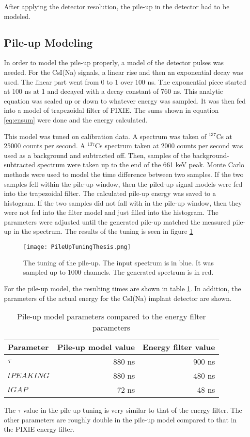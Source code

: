 \documentclass[../MaxHughesThesis.tex]{subfiles}
\begin{document}
After applying the detector resolution, the pile-up in the detector had to be modeled.

\subsection{Pile-up Modeling}
In order to model the pile-up properly, a model of the detector pulses was needed. 
For the CsI(Na) signals, a linear rise and then an exponential decay was used.
The linear part went from 0 to 1 over 100 ns. 
The exponential piece started at 100 ns at 1 and decayed with a decay constant of 760 ns.
This analytic equation was scaled up or down to whatever energy was sampled.
It was then fed into a model of trapezoidal filter of PIXIE. 
The sums shown in equation \ref{eq:ensum} were done and the energy calculated.

This model was tuned on calibration data. 
A spectrum was taken of $^{137}$Cs at 25000 counts per second.
A  $^{137}$Cs spectrum taken at 2000 counts per second was used as a background and subtracted off.
Then, samples of the background-subtracted spectrum were taken up to the end of the 661 keV peak.
Monte Carlo methods were used to model the time difference between two samples.
If the two samples fell within the pile-up window, then the piled-up signal models were fed into the trapezoidal filter.
The calculated pile-up energy was saved to a histogram.
If the two samples did not fall with in the pile-up window, then they were not fed into the filter model and just filled into the histogram.
The parameters were adjusted until the generated pile-up matched the measured pile-up in the spectrum.
The results of the tuning is seen in figure \ref{fig:pileuptune}

\begin{figure}[!htb]
	\centerline{\texttt{[image: PileUpTuningThesis.png]}}
	\caption{The tuning of the pile-up.
		 The input spectrum is in blue.
		 It was sampled up to 1000 channels.
		 The generated spectrum is in red.}
	\label{fig:pileuptune}
\end{figure}
For the pile-up model, the resulting times are shown in table \ref{tab:tunepileupmodel}.
In addition, the parameters of the actual energy for the CsI(Na) implant detector are shown.

\begin{table}[!hbt]
	\centering
	\caption{Pile-up model parameters compared to the energy filter parameters}
		\begin{tabular}{lrr}
		Parameter & Pile-up model value & Energy filter value \\ \hline
		$\tau$ & 880 ns & 900 ns \\
		$tPEAKING$ & 880 ns & 480 ns \\
		$tGAP$ & 72 ns & 48 ns  
		\end{tabular}
		\label{tab:tunepileupmodel}
\end{table}
The $\tau$ value in the pile-up tuning is very similar to that of the energy filter.
The other parameters are roughly double in the pile-up model compared to that in the PIXIE energy filter.
\end{document}
